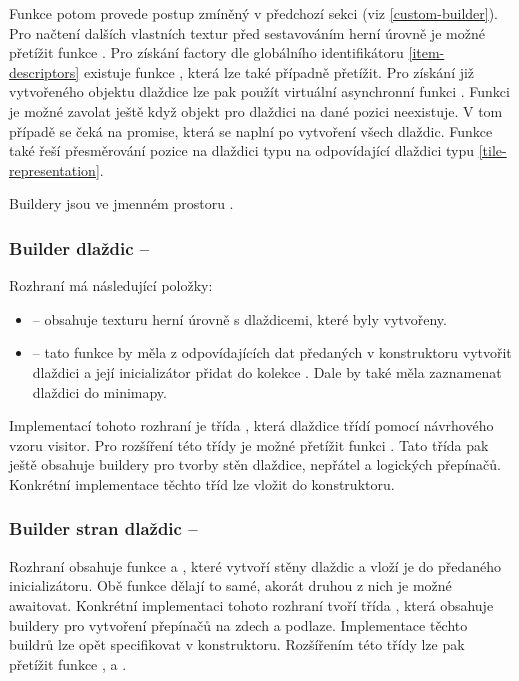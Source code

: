 Funkce  potom provede postup zmíněný v předchozí sekci (viz \ref{custom-builder}). Pro načtení dalších vlastních textur 
před sestavováním herní úrovně je možné přetížit funkce . Pro získání factory dle globálního identifikátoru \vref{item-descriptors} 
existuje funkce , která lze také případně přetížit. Pro získání již vytvořeného objektu dlaždice lze pak použít virtuální asynchronní funkci
. Funkci je možné zavolat ještě když objekt pro dlaždici na dané pozici neexistuje. V tom případě se čeká na promise, která se naplní 
po vytvoření všech dlaždic. Funkce také řeší přesměrování pozice na dlaždici typu  na odpovídající dlaždici typu  \vref{tile-representation}.

Buildery jsou ve jmenném prostoru .


\subsubsection{Builder dlaždic -- }

Rozhraní  má následující položky:
\begin{itemize}
\item {} -- obsahuje texturu herní úrovně s dlaždicemi, které byly vytvořeny. 
\item {} -- tato funkce by měla z odpovídajících dat předaných v konstruktoru vytvořit dlaždici a její inicializátor přidat 
	do kolekce . Dale by také měla zaznamenat dlaždici do minimapy.
\end{itemize}  
Implementací tohoto rozhraní je třída , která dlaždice třídí pomocí návrhového vzoru visitor. Pro rozšíření
	této třídy je možné přetížit funkci . Tato třída pak ještě obsahuje buildery pro tvorby stěn dlaždice, nepřátel a logických přepínačů.
	Konkrétní implementace těchto tříd lze vložit do konstruktoru.


\subsubsection{Builder stran dlaždic -- }

Rozhraní  obsahuje funkce  a , které vytvoří stěny dlaždic
a vloží je do předaného inicializátoru. Obě funkce dělají to samé, akorát druhou z nich je možné awaitovat. Konkrétní implementaci
tohoto rozhraní tvoří třída , která obsahuje buildery pro vytvoření přepínačů na zdech a podlaze. Implementace
těchto buildrů lze opět specifikovat v konstruktoru. Rozšířením této třídy lze pak přetížit funkce , 
 a .



